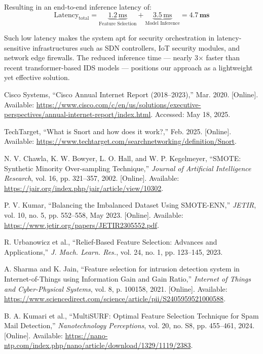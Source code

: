 \documentclass[conference]{IEEEtran}
\begin{document}
Resulting in an end-to-end inference latency of:
\[
\text{Latency}_{\text{total}} = \underbrace{1.2\,\text{ms}}_{\text{Feature Selection}} + \underbrace{3.5\,\text{ms}}_{\text{Model Inference}} = \mathbf{4.7\,\text{ms}}
\]

Such low latency makes the system apt for security orchestration in latency-sensitive infrastructures such as SDN controllers, IoT security modules, and network edge firewalls. The reduced inference time — nearly 3$\times$ faster than recent transformer-based IDS models — positions our approach as a lightweight yet effective solution.




\begin{thebibliography}{00}

Cisco Systems, ``Cisco Annual Internet Report (2018--2023),'' Mar. 2020. [Online]. Available: \url{https://www.cisco.com/c/en/us/solutions/executive-perspectives/annual-internet-report/index.html}. Accessed: May 18, 2025.

TechTarget, ``What is Snort and how does it work?,'' Feb. 2025. [Online]. Available: \url{https://www.techtarget.com/searchnetworking/definition/Snort}.

N. V. Chawla, K. W. Bowyer, L. O. Hall, and W. P. Kegelmeyer, ``SMOTE: Synthetic Minority Over-sampling Technique,'' \textit{Journal of Artificial Intelligence Research}, vol. 16, pp. 321--357, 2002. [Online]. Available: \url{https://jair.org/index.php/jair/article/view/10302}.

P. V. Kumar, ``Balancing the Imbalanced Dataset Using SMOTE-ENN,'' \textit{JETIR}, vol. 10, no. 5, pp. 552--558, May 2023. [Online]. Available: \url{https://www.jetir.org/papers/JETIR2305552.pdf}.

R. Urbanowicz et al., ``Relief-Based Feature Selection: Advances and Applications,'' \textit{J. Mach. Learn. Res.}, vol. 24, no. 1, pp. 123--145, 2023.

A. Sharma and K. Jain, ``Feature selection for intrusion detection system in Internet-of-Things using Information Gain and Gain Ratio,'' \textit{Internet of Things and Cyber-Physical Systems}, vol. 8, p. 100158, 2021. [Online]. Available: \url{https://www.sciencedirect.com/science/article/pii/S2405959521000588}.

B. A. Kumari et al., ``MultiSURF: Optimal Feature Selection Technique for Spam Mail Detection,'' \textit{Nanotechnology Perceptions}, vol. 20, no. S8, pp. 455--461, 2024. [Online]. Available: \url{https://nano-ntp.com/index.php/nano/article/download/1329/1119/2383}.


\end{thebibliography}
\end{document}
